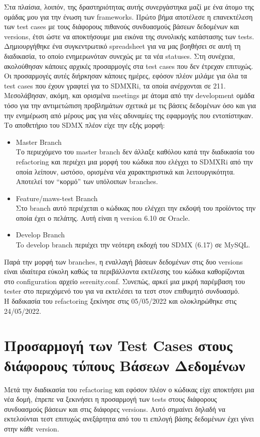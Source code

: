 Στα πλαίσια, λοιπόν, της δραστηριότητας αυτής συνεργάστηκα μαζί με ένα άτομο της ομάδας μου για την ένωση των frameworks. Πρώτο βήμα αποτέλεσε η επανεκτέλεση των test 
cases με τους διάφορους πιθανούς συνδυασμούς βάσεων δεδομένων και versions, έτσι ώστε να αποκτήσουμε μια εικόνα της συνολικής κατάστασης των tests. Δημιουργήθηκε ένα 
συγκεντρωτικό spreadsheet για να μας βοηθήσει σε αυτή τη διαδικασία, το οποίο ενημερωνόταν συνεχώς με τα νέα statuses. Στη συνέχεια, ακολούθησαν κάποιες αρχικές προσαρμογές στα test cases που δεν έτρεχαν επιτυχώς. 
Οι προσαρμογές αυτές διήρκησαν κάποιες ημέρες, εφόσον πλέον μιλάμε για όλα τα test cases που έχουν γραφτεί για το SDMXRi, τα οποία ανέρχονται σε 211. Μεσολάβησαν, ακόμη, και ορισμένα meetings με άτομα από 
την development ομάδα τόσο για την αντιμετώπιση προβλημάτων σχετικά με τις βάσεις δεδομένων όσο και για την ενημέρωση από μέρους μας για νέες αδυναμίες της εφαρμογής που εντοπίστηκαν. Το αποθετήριο 
του SDMX πλέον είχε την εξής μορφή:
\begin{itemize}
    \item Master Branch\\ Το περιεχόμενο του master branch δεν άλλαξε καθόλου κατά την διαδικασία του refactoring και περιέχει μια μορφή του κώδικα που ελέγχει το SDMXRi από την οποία λείπουν, ωστόσο, ορισμένα 
    νέα χαρακτηριστικά και λειτουργικότητα. Αποτελεί τον ``κορμό'' των υπόλοιπων branches.
    \item Feature/maws-test Branch\\ Στο branch αυτό περιέχεται ο κώδικας που ελέγχει την εκδοψή του προϊόντος την οποία έχει ο πελάτης. Αυτή είναι η version 6.10 σε Oracle.
	\item Develop Branch\\ To develop branch περιέχει την νεότερη εκδοχή του SDMX (6.17) σε MySQL.
\end{itemize}
Παρά την μορφή των branches, η εναλλαγή βάσεων δεδομένων στις δυο versions είναι ιδιαίτερα εύκολη καθώς τα περιβάλλοντα εκτέλεσης του κώδικα καθορίζονται στο configuration αρχείο serenity.conf. 
Συνεπώς, αρκεί μια μικρή παρέμβαση του tester στο περιεχόμενό του για να εκτελέσει τα τεστ στον επιθυμητό συνδυασμό.\\
Η δαδικασία του refactoring ξεκίνησε στις 05/05/2022 και ολοκληρώθηκε στις 24/05/2022.

\section*{Προσαρμογή των Test Cases στους διάφορους τύπους Βάσεων Δεδομένων}
Μετά την διαδικασία του refactoring και εφόσον πλέον ο κώδικας είχε αποκτήσει μια νέα δομή, έπρεπε να ξεκινήσει η προσαρμογή των tests στους διάφορους συνδυασμούς βάσεων και στις διάφορες versions. Αυτό σημαίνει δηλαδή 
να εκτελούνται τεστ επιτυχώς ανεξάρτητα από του τι επιλογή βάσης δεδομένων έχει γίνει στην κάθε version. \\

